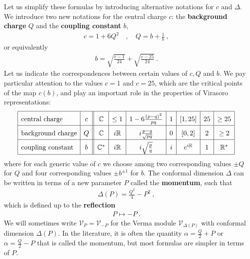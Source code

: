 \documentclass[12pt, a4paper, notitlepage, twoside]{report}
\numberwithin{equation}{section}
\theoremstyle{break}
\begin{document}
Let us simplify these formulas by introducing alternative notations for $c$ and $\Delta$.
We introduce two new notations for the central charge $c$: the \textbf{\boldmath background charge} $Q$ and the \textbf{\boldmath coupling constant} $b$,
\begin{align}
\boxed{ c= 1+6Q^2 }\quad , \quad \boxed{Q = b+\frac{1}{b}}\ ,
\label{cqb}
\end{align}
or equivalently
\begin{align}
 b = \sqrt{\frac{c-1}{24}} + \sqrt{\frac{c-25}{24}}\ .
\end{align}
Let us indicate the correspondences between certain values of $c,Q$ and $b$. We pay particular attention to the values $c=1$ and $c=25$, which are the critical points of the map $c(b)$, and play an important role in the properties of Virasoro representations:
\begin{align}
\renewcommand{\arraystretch}{1.7}
 \begin{array}{|l|c||c|c|c|c|c|c|c|}
  \hline
  \text{central\ charge} & c & \mathbb{C} & \leq 1 & 1-6\frac{(p-q)^2}{pq} & 1 & [1,25] & 25 & \geq 25 
\\
\hline
\text{background\ charge} & Q & \mathbb{C} & i{\mathbb{R}} & i\frac{p-q}{\sqrt{pq}} & 0 & [0,2] & 2 & \geq 2 
\\
\hline
\text{coupling\ constant} &
b& \mathbb{C}^* & i{\mathbb{R}} & i\sqrt{\frac{p}{q}} & i & e^{i\mathbb{R}} & 1 & {\mathbb{R}^*}
\\
\hline
 \end{array}
\label{cqbval}
\end{align}
where for each generic value of $c$ we choose among two corresponding values $\pm Q$ for $Q$ and four corresponding values $\pm b^{\pm 1}$ for $b$.
The conformal dimension $\Delta$ can be written in terms of a 
new parameter $P$ called the \textbf{\boldmath momentum}, such that 
\begin{align}
 \boxed{\Delta(P) = \frac{Q^2}{4} - P^2}\ ,
\label{daq}
\end{align}
which is defined up to the \textbf{\boldmath reflection}
\begin{align}
 P \mapsto -P\ .
\label{arqa}
\end{align}
We will sometimes write $\mathcal{V}_P=\mathcal{V}_{-P}$ for the Verma module $\mathcal{V}_{\Delta(P)}$ with conformal dimension $\Delta(P)$. In the literature, it is often the quantity $\alpha = \frac{Q}{2}+P$ or $\alpha=\frac{Q}{2}-P$ that is called the momentum, but most formulas are simpler in terms of $P$.
\end{document}
